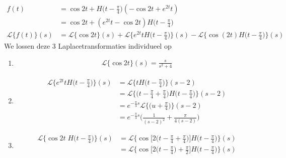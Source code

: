 \documentclass[12pt]{report}
\begin{document}
\begin{itemize}[label={}]
{{    }{
        \begin{equation*}
         \begin{split}
          f(t) & = \cos 2t + H\big(t-\frac{\pi}{4}\big)(-\cos 2t + e^{2t}t) \\
               & = \cos 2t + (e^{2t}t - \cos 2t)H\big(t - \frac{\pi}{4}\big) \\
          \mathcal{L}\{f(t)\}(s) & = \mathcal{L}\{\cos 2t\}(s) + \mathcal{L}\{e^{2t}tH\big(t - \frac{\pi}{4}\big)\}(s) - \mathcal{L}\{\cos(2t)H\big(t - \frac{\pi}{4}\big)\}(s)
         \end{split}
        \end{equation*}
    We lossen deze 3 Laplacetransformaties individueel op
    \begin{enumerate}
     \item \begin{equation*}
            \begin{split}
                \mathcal{L}\{\cos 2t\}(s) = \frac{s}{s^2 + 4}
            \end{split}
           \end{equation*}
     \item \begin{equation*}
            \begin{split}
                    \mathcal{L}\{e^{2t}tH\big(t - \frac{\pi}{4}\big)\}(s) & = \mathcal{L}\{tH\big(t - \frac{\pi}{4}\big)\}(s - 2) \\
                                                                        & = \mathcal{L}\{\big(t - \frac{\pi}{4} + \frac{\pi}{4}\big)H\big(t - \frac{\pi}{4}\big)\}(s - 2) \\
                                                                        & = e^{-\frac{\pi}{4}s}\mathcal{L}\{\big(u + \frac{\pi}{4}\big)\}(s - 2) \\
                                                                        & = e^{-\frac{\pi}{4}s}\bigg(\frac{1}{(s - 2)^2} +  \frac{\pi}{4(s - 2)}\bigg)
              \end{split}
             \end{equation*}
    \item \begin{equation*}
            \begin{split}
                \mathcal{L}\{\cos 2t\;H\big(t - \frac{\pi}{4}\big)\}(s) & = \mathcal{L}\{\cos \big[2\big(t-\frac{\pi}{4} + \frac{\pi}{4}\big)\big]H\big(t - \frac{\pi}{4}\big)\}(s) \\
                                                                        & = \mathcal{L}\{\cos\big[2\big(t - \frac{\pi}{4}\big) + \frac{\pi}{2}\big]H\big(t - \frac{\pi}{4}\big)\}(s) \\

\end{split}
\end{equation*}
\end{enumerate}}}
\end{itemize}
\end{document}
